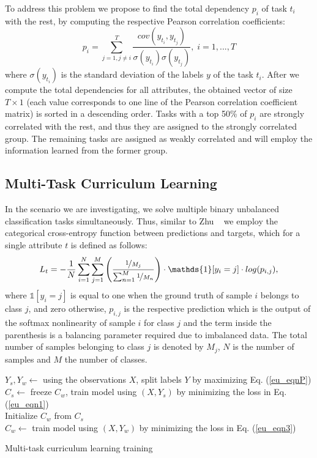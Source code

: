 \documentclass[10pt,twocolumn,letterpaper]{article}
\begin{document}
	To address this problem we propose to find the total dependency \(p_{i}\) of task \(t_{i}\) with the rest, by computing the respective Pearson correlation coefficients:  
	\begin{equation} \label{eu_eqnP}
	p_{i} =\sum_{j=1, j\neq i}^{T} \frac{cov(y_{t_{i}},y_{t_{j}})}{\sigma(y_{{t_{i}}})\sigma(y_{{t_{j}}})}, \; i=1,...,T
	\end{equation}
	where \(\sigma(y_{{t_{i}}})\) is the standard deviation of the labels \(y\) of the task \(t_{i}\). After we compute the total dependencies for all attributes, the obtained vector of size \(T \times 1\) (each value corresponds to one line of the Pearson correlation coefficient matrix) is sorted in a descending order. 
	Tasks with a top 50\% of \(p_i\) are strongly correlated with the rest, and thus they are assigned to the strongly correlated group. The remaining tasks are assigned as weakly correlated and will employ the information learned from the former group.  
	
	\subsection{Multi-Task Curriculum Learning}
	In the scenario we are investigating, we solve multiple binary unbalanced classification tasks simultaneously. Thus, similar to Zhu \etal~\cite{zhu2016multi} we employ the categorical cross-entropy function between predictions and targets, which for a single attribute \(t\) is defined as follows: 
	\begin{equation} \label{eu_eqn1}
	L_t = -\frac{1}{N}\sum_{i=1}^{N}\sum_{j=1}^{M} \Bigg( \frac{\nicefrac{1}{M_j}}{\sum_{n=1}^{M}\nicefrac{1}{M_n}}\Bigg)\cdot \mathds{1}[y_{i}=j] \cdot log(p_{i,j}),
	\end{equation}
	where \(\mathds{1}[y_{i}=j]\) is equal to one when the ground truth of sample \(i\) belongs to class \(j\), and zero otherwise, \(p_{i,j}\) is the respective prediction which is the output of the softmax nonlinearity of sample \(i\) for class \(j\) and the term inside the parenthesis is a balancing parameter required due to imbalanced data. The total number of samples belonging to class \(j\) is denoted by \(M_j\), \(N\) is the number of samples and \(M\) the number of classes. 
	
	\begin{algorithm}[t]
		\(Y_s, Y_w\leftarrow\) using the observations \(X\), split labels \(Y\) by maximizing Eq. (\ref{eu_eqnP})\\
		\(C_s \leftarrow\) freeze \(C_w\), train model using \((X, Y_s)\) by minimizing the loss in Eq. (\ref{eu_eqn1})  \\
		Initialize \(C_w\) from \(C_s\)\\
		\(C_w \leftarrow\) train model using \((X, Y_w)\) by minimizing the loss in Eq. (\ref{eu_eqn3})\\
		\caption{Multi-task curriculum learning training}
		\label{alg1} 
	\end{algorithm}
	
\end{document}
